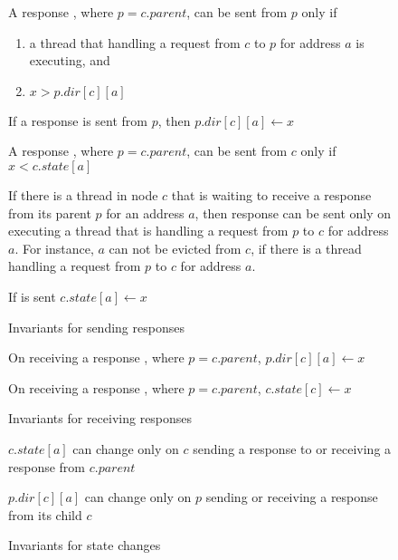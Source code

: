 \begin{figure}\small
\begin{inv}
A response , where $p = c.parent$, can be sent from $p$ only
if
\begin{enumerate}
\item a thread that handling a request from $c$ to $p$ for
address $a$ is executing, and
\item $x > p.dir[c][a]$
\end{enumerate}
\label{cSendRespPre}
\end{inv}
\begin{inv}
If a response  is sent from $p$, then $p.dir[c][a] \gets x$
\label{cSendRespPost}
\end{inv}
\begin{inv}
A response , where $p = c.parent$, can be sent from $c$ only
if $x < c.state[a]$ \label{pSendRespPre1}
\end{inv}
\begin{inv}
If there is a thread in node $c$ that is waiting to receive a response from its
parent $p$ for an address $a$, then response  can be sent only
on executing a thread that is handling a request from $p$ to $c$ for address
$a$. For instance, $a$ can not be evicted from $c$, if there is a thread
handling a request from $p$ to $c$ for address $a$.
\label{pSendRespPre2}
\end{inv}
\begin{inv}
If  is sent $c.state[a] \gets x$
\label{pSendRespPost}
\end{inv}
\caption{Invariants for sending responses}
\label{sendResp}
\end{figure}

\begin{figure}\small
\begin{inv}
On receiving a response , where $p = c.parent$, $p.dir[c][a]
\gets x$
\label{pRecvResp}
\end{inv}
\begin{inv}
On receiving a response , where $p = c.parent$, $c.state[c]
\gets x$
\label{cRecvResp}
\end{inv}
\caption{Invariants for receiving responses}
\label{recvResp}
\end{figure}

\begin{figure}\small
\begin{inv}
$c.state[a]$ can change only on $c$ sending a response to or receiving a
response from $c.parent$
\label{cState}
\end{inv}
\begin{inv}
$p.dir[c][a]$ can change only on $p$ sending or receiving a response from
its child $c$
\label{pState}
\end{inv}
\caption{Invariants for state changes}
\label{stateChange}
\end{figure}

